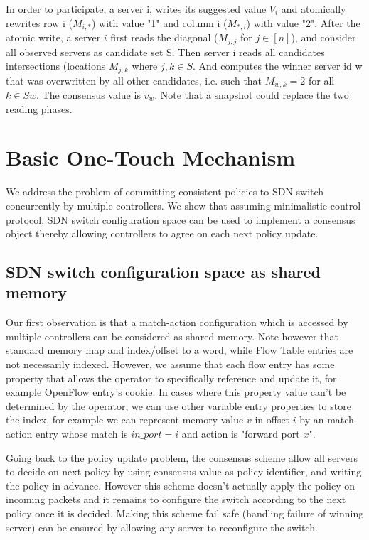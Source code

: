 \documentclass[conference]{sigcomm-alternate}
\begin{document}
In order to participate, a server i, writes its suggested value $V_i$ and atomically rewrites row i ($M_{i,*}$) with value "1" and column i ($M_{*,i}$) with value "2". After the atomic write, a server $i$ first reads the diagonal ($M_{j,j}$ for $j\in [n]$), and consider all observed servers as candidate set S.  Then server i reads all candidates intersections (locations $M_{j,k}$ where $j,k\in S$. And computes the winner server id w that was overwritten by all other candidates, i.e. such that $M_{w,k}=2$ for all $k\in S {w}$. The consensus value is $v_w$.
Note that a snapshot could replace the two reading phases.



\section{Basic One-Touch Mechanism}\label{sec:realization}

We address the problem of committing consistent policies to SDN switch concurrently by multiple controllers.
We show that assuming minimalistic control protocol, SDN switch configuration space can be used to implement a consensus object thereby allowing controllers to agree on each next policy update.

\subsection{SDN switch configuration space as shared memory}





Our first observation is that a match-action configuration which is accessed by multiple controllers can be considered as shared memory. Note however that standard memory map and index/offset to a word, while Flow Table entries are not necessarily indexed. However, we assume that each flow entry has some property that allows the operator to specifically reference and update it, for example OpenFlow entry's cookie. In cases where this property value can't be determined by the operator, we can use other variable entry properties to store the index, for example we can represent memory value $v$ in offset $i$ by an match-action entry whose match is $in\_port = i$ and action is "forward port $x$".


Going back to the policy update problem, the consensus scheme allow all servers to decide on next policy by using consensus value as policy identifier, and writing the policy in advance. However this scheme doesn't actually apply the policy on incoming packets and it remains to configure the switch according to the next policy once it is decided. Making this scheme fail safe (handling failure of winning server) can be ensured by allowing any server to reconfigure the switch.
\end{document}
